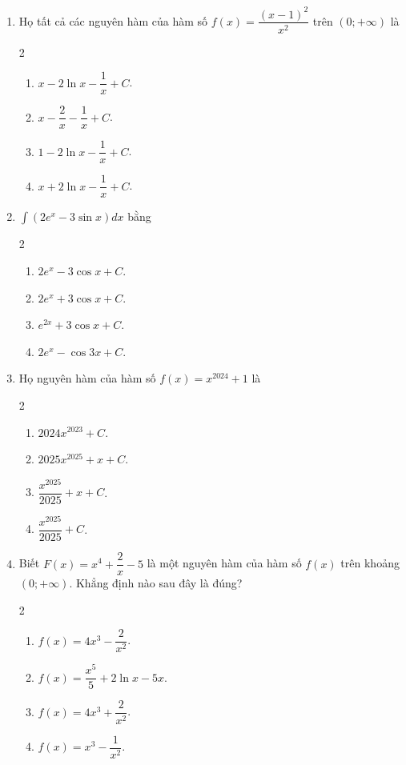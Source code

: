 \documentclass[12pt]{article}
\begin{document}
\begin{enumerate}[label=\textbf{Câu \arabic*.}]
		\item Họ tất cả các nguyên hàm của hàm số $f(x) = \dfrac{(x-1)^2}{x^2}$ trên $(0; +\infty)$ là
		\begin{multicols}{2}
			\begin{enumerate}[label=\textbf{\Alph*.}]
				\item $x - 2\ln x - \dfrac{1}{x} + C$.
				\item $x - \dfrac{2}{x} - \dfrac{1}{x} + C$.
				\item $1 - 2\ln x - \dfrac{1}{x} + C$.
				\item $x + 2\ln x - \dfrac{1}{x} + C$.
			\end{enumerate}
		\end{multicols}
		
		\item $\displaystyle \int (2e^x - 3\sin x) dx$ bằng
		\begin{multicols}{2}
			\begin{enumerate}[label=\textbf{\Alph*.}]
				\item $2e^x - 3\cos x + C$.
				\item $2e^x + 3\cos x + C$.
				\item $e^{2x} + 3\cos x + C$.
				\item $2e^x - \cos 3x + C$.
			\end{enumerate}
		\end{multicols}
		
		\item Họ nguyên hàm của hàm số $f(x) = x^{2024} + 1$ là
		\begin{multicols}{2}
			\begin{enumerate}[label=\textbf{\Alph*.}]
				\item $2024x^{2023} + C$.
				\item $2025x^{2025} + x + C$.
				\item $\dfrac{x^{2025}}{2025} + x + C$.
				\item $\dfrac{x^{2025}}{2025} + C$.
			\end{enumerate}
		\end{multicols}
		
		\item Biết $F(x) = x^4 + \dfrac{2}{x} - 5$ là một nguyên hàm của hàm số $f(x)$ trên khoảng $(0; +\infty)$. Khẳng định nào sau đây là đúng?
		\begin{multicols}{2}
			\begin{enumerate}[label=\textbf{\Alph*.}]
				\item $f(x) = 4x^3 - \dfrac{2}{x^2}$.
				\item $f(x) = \dfrac{x^5}{5} + 2\ln x - 5x$.
				\item $f(x) = 4x^3 + \dfrac{2}{x^2}$.
				\item $f(x) = x^3 - \dfrac{1}{x^2}$.
			\end{enumerate}
		\end{multicols}
		

\end{enumerate}
\end{document}
